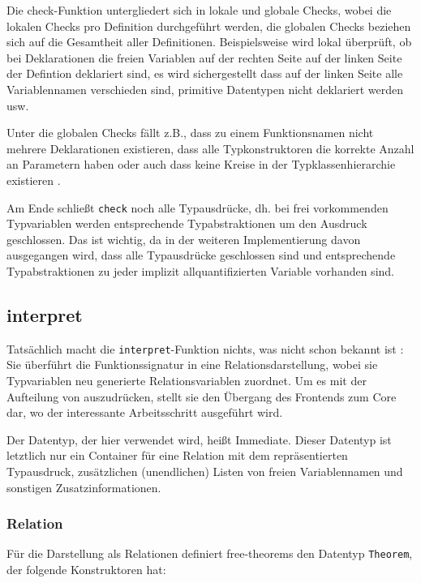 \documentclass[11pt]{article} %
\begin{document}
Die check-Funktion untergliedert sich in lokale und globale Checks, wobei die lokalen Checks pro Definition durchgeführt werden, die globalen Checks beziehen sich auf die Gesamtheit aller Definitionen. Beispielsweise wird lokal überprüft, ob bei Deklarationen die freien Variablen auf der rechten Seite auf der linken Seite der Defintion deklariert sind, es wird sichergestellt
dass auf der linken Seite alle Variablennamen verschieden sind, primitive Datentypen nicht deklariert werden usw.

Unter die globalen Checks fällt z.B., dass zu einem Funktionsnamen nicht mehrere Deklarationen existieren, dass alle Typkonstruktoren die korrekte Anzahl an Parametern haben oder auch dass keine Kreise in der Typklassenhierarchie existieren \cite{freetheorems}.

Am Ende schließt \texttt{check} noch alle Typausdrücke, dh. bei frei vorkommenden Typvariablen werden entsprechende Typabstraktionen um den Ausdruck geschlossen. Das ist wichtig, da in der weiteren Implementierung davon ausgegangen wird, dass alle Typausdrücke geschlossen sind und entsprechende Typabstraktionen zu jeder implizit allquantifizierten Variable vorhanden sind.

\subsection{interpret}

Tatsächlich macht die \texttt{interpret}-Funktion nichts, was nicht schon bekannt ist : Sie überführt die Funktionssignatur in eine
Relationsdarstellung, wobei sie Typvariablen neu generierte Relationsvariablen zuordnet. Um es mit der Aufteilung von \cite{freetheorems} auszudrücken, stellt sie den Übergang des Frontends zum Core dar, wo der interessante Arbeitsschritt ausgeführt wird.

Der Datentyp, der hier verwendet wird, heißt Immediate. Dieser Datentyp ist letztlich nur ein Container für eine Relation mit
dem repräsentierten Typausdruck, zusätzlichen (unendlichen) Listen von freien Variablennamen und sonstigen Zusatzinformationen.

\subsubsection{Relation}

Für die Darstellung als Relationen definiert free-theorems den Datentyp \texttt{Theorem}, der folgende Konstruktoren hat:
\end{document}
